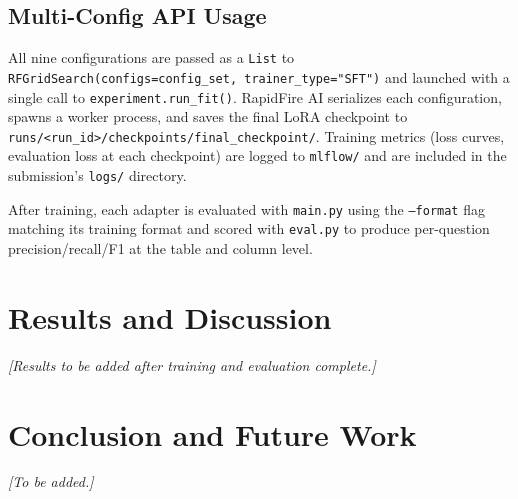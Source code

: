 \documentclass[11pt,letterpaper]{article}
\begin{document}
\subsection{Multi-Config API Usage}

All nine configurations are passed as a \texttt{List} to
\texttt{RFGridSearch(configs=config\_set, trainer\_type="SFT")} and launched
with a single call to \texttt{experiment.run\_fit()}.
RapidFire AI serializes each configuration, spawns a worker process, and saves
the final LoRA checkpoint to
\texttt{runs/<run\_id>/checkpoints/final\_checkpoint/}.
Training metrics (loss curves, evaluation loss at each checkpoint) are logged
to \texttt{mlflow/} and are included in the submission's \texttt{logs/}
directory.

After training, each adapter is evaluated with \texttt{main.py} using the
\texttt{--format} flag matching its training format and scored with
\texttt{eval.py} to produce per-question precision/recall/F1 at the table
and column level.

\section{Results and Discussion}
\label{sec:results}


\textit{[Results to be added after training and evaluation complete.]}

\section{Conclusion and Future Work}
\label{sec:conclusion}

\textit{[To be added.]}
\end{document}
